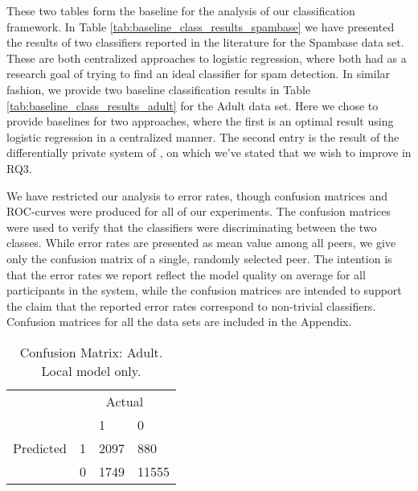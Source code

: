These two tables form the baseline for the analysis of our classification framework. In Table \ref{tab:baseline_class_results_spambase} we have presented the results of two classifiers reported in the literature \citep{sharma2013adaptive,kumar2012comparative} for the Spambase data set. These are both centralized approaches to logistic regression, where both had as a research goal of trying to find an ideal classifier for spam detection. In similar fashion, we provide two baseline classification results in Table \ref{tab:baseline_class_results_adult} for the Adult data set. Here we chose to provide baselines for two approaches, where the first \citep{caruana2006empirical} is an optimal result using logistic regression in a centralized manner. The second entry is the result of the differentially private system of \cite{pathak2010diffprivhomo}, on which we've stated that we wish to improve in RQ3.

We have restricted our analysis to error rates, though confusion matrices and ROC-curves were produced for all of our experiments. The confusion matrices were used to verify that the classifiers were discriminating between the two classes. While error rates are presented as mean value among all peers, we give only the confusion matrix of a single, randomly selected peer. The intention is that the error rates we report reflect the model quality on average for all participants in the system, while the confusion matrices are intended to support the claim that the reported error rates correspond to non-trivial classifiers. Confusion matrices for all the data sets are included in the Appendix. 


\begin{table}[h]
	\centering
	\caption{Confusion Matrix: Adult. Local model only.}
	\label{fig:confmat_adult_local}
	\begin{tabular}{llll}
		& \multicolumn{3}{c}{Actual}                                                      \\
		\multicolumn{1}{c}{} &                        & 1                         & 0                          \\ \cline{3-4} 
		Predicted            & \multicolumn{1}{l|}{1} & \multicolumn{1}{l|}{2097} & \multicolumn{1}{l|}{880}   \\ \cline{3-4} 
		& \multicolumn{1}{l|}{0} & \multicolumn{1}{l|}{1749} & \multicolumn{1}{l|}{11555} \\ \cline{3-4} 
	\end{tabular}
\end{table}

